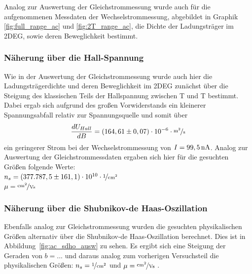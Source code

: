 

Analog zur Auswertung der Gleichstrommessung wurde auch für die aufgenommenen Messdaten der Wechselstrommessung, abgebildet in Graphik \ref{fig:full_range_ac} und \ref{fig:2T_range_ac}, die Dichte der Ladungsträger im 2DEG, sowie deren Beweglichkeit bestimmt.

\subsubsection{Näherung über die Hall-Spannung}
\label{ch:naeherung_hall2}

Wie in der Auswertung der Gleichstrommessung wurde auch hier die Ladungsträgerdichte und deren Beweglichkeit im 2DEG zunächst über die Steigung des klassischen Teils der Hallspannung zwischen \unit[-2]{T} und \unit[2]{T} bestimmt. Dabei ergab sich aufgrund des großen Vorwiderstands ein kleinerer Spannungsabfall relativ zur Spannungsquelle und somit über
\begin{equation}
	\d{U_{Hall}}{B} = ( 164,61 \pm 0,07 ) \cdot 10^{-6} \cdot \unitfrac{m^2}{s}
\end{equation}
ein geringerer Strom bei der Wechselstrommessung von $I=\unit[99,5]{nA}$. Analog zur Auswertung der Gleichstrommessdaten ergaben sich hier für die gesuchten Größen folgende Werte: \\
$n_s=  ( 377.787,5 \pm 161,1) \cdot 10^{10} \cdot \unitfrac{1}{cm^2}$\\
$\mu= \unitfrac{cm^2}{Vs}$  %


\subsubsection{Näherung über die Shubnikov-de Haas-Oszillation}
\label{ch:naeherung_ac}

Ebenfalls analog zur Gleichstrommessung wurden die gesuchten physikalischen Größen alternativ über die Shubnikov-de Haas-Oszillation berechnet. Dies ist in Abbildung~\ref{fig:ac_sdho_ausw} zu sehen. 
Es ergibt sich eine Steigung der Geraden von $b=...$  %
und daraus analog zum vorherigen Versuchsteil die physikalischen Größen: $n_s= \unitfrac{1}{cm^2}$  %
und          
$\mu= \unitfrac{cm^2}{Vs}$ . %




